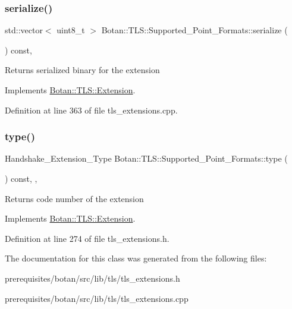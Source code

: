 \subsubsection{\texorpdfstring{serialize()}{serialize()}}
{\footnotesize\ttfamily std\+::vector$<$ uint8\+\_\+t $>$ Botan\+::\+T\+L\+S\+::\+Supported\+\_\+\+Point\+\_\+\+Formats\+::serialize (\begin{DoxyParamCaption}{ }\end{DoxyParamCaption}) const\hspace{0.3cm}{\ttfamily [override]}, {\ttfamily [virtual]}}

\begin{DoxyReturn}{Returns}
serialized binary for the extension 
\end{DoxyReturn}


Implements \mbox{\hyperlink{class_botan_1_1_t_l_s_1_1_extension_a56788726ad2526db54e5a26039cb69db}{Botan\+::\+T\+L\+S\+::\+Extension}}.



Definition at line 363 of file tls\+\_\+extensions.\+cpp.

\mbox{\label{class_botan_1_1_t_l_s_1_1_supported___point___formats_aeaf44021244451a57f6c257f13aa0a7d}} 
\subsubsection{\texorpdfstring{type()}{type()}}
{\footnotesize\ttfamily Handshake\+\_\+\+Extension\+\_\+\+Type Botan\+::\+T\+L\+S\+::\+Supported\+\_\+\+Point\+\_\+\+Formats\+::type (\begin{DoxyParamCaption}{ }\end{DoxyParamCaption}) const\hspace{0.3cm}{\ttfamily [inline]}, {\ttfamily [override]}, {\ttfamily [virtual]}}

\begin{DoxyReturn}{Returns}
code number of the extension 
\end{DoxyReturn}


Implements \mbox{\hyperlink{class_botan_1_1_t_l_s_1_1_extension_ac8819b312ce604453225e7b4f7c373ec}{Botan\+::\+T\+L\+S\+::\+Extension}}.



Definition at line 274 of file tls\+\_\+extensions.\+h.



The documentation for this class was generated from the following files\+:\begin{DoxyCompactItemize}
\item 
prerequisites/botan/src/lib/tls/tls\+\_\+extensions.\+h\item 
prerequisites/botan/src/lib/tls/tls\+\_\+extensions.\+cpp\end{DoxyCompactItemize}

